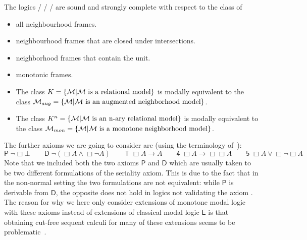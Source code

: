 \documentclass{llncs}
\begin{document}
\begin{theorem}
The logics \E{} / \E{\axC}/ \E{\axN}/ \E{\axM} are sound and strongly complete with respect to the class of
\begin{itemize}
\item  all neighbourhood frames.
\item neighbourhood frames that are closed under intersections.
\item  neighborhood frames that contain the unit.
\item monotonic frames.
\end{itemize}
\end{theorem}


\begin{theorem}
\begin{itemize}
\item The class $K = \{\mathcal M | \mathcal M \mbox{ is a relational model} \}$ is modally equivalent to the class $\mathcal M_{aug} = \{\mathcal M | \mathcal M \mbox{ is an augmented neighborhood model}\}$.

\item The class $K^n = \{\mathcal M | \mathcal M \mbox{ is an n-ary relational model} \}$ is modally equivalent to the class $\mathcal M_{mon} =  \{\mathcal M | \mathcal M \mbox{ is a monotone neighborhood model}\}$.
\end{itemize}
\end{theorem}

The further axioms we
are going to consider are (using the terminology
of~\cite{Hansen:2003}):
\[
  \mathsf{P}\; \neg \Box \bot
  \qquad
  \mathsf{D}\; \neg (\Box A \land \Box \neg A)
  \qquad
  \mathsf{T}\; \Box A \to A
  \qquad
  \mathsf{4}\; \Box A \to \Box \Box A
  \qquad
  \mathsf{5}\; \Box A \lor \Box \neg \Box A
\]
Note that we included both the two axioms $\mathsf{P}$ and $\mathsf{D}$ which are
usually taken to be two different formulations of the seriality axiom. %
This is due to the fact that in the non-normal setting the
two formulations are not equivalent: while $\mathsf{P}$ is derivable from
$\mathsf{D}$, the opposite does not hold in logics not validating the axiom
\axC. The reason for why we here only consider extensions of monotone
modal logic with these axioms instead of extensions of classical modal
logic $\mathsf{E}$ is that obtaining cut-free sequent calculi for many
of these extensions seems to be problematic~\cite{Indrzejczak:2011}.
\end{document}
